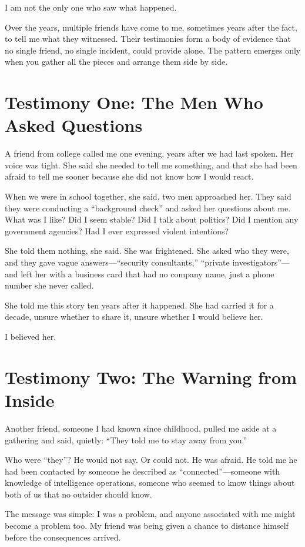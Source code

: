 \documentclass[11pt,openany]{book}
\begin{document}
I am not the only one who saw what happened.

Over the years, multiple friends have come to me, sometimes years after the fact, to tell me what they witnessed. Their testimonies form a body of evidence that no single friend, no single incident, could provide alone. The pattern emerges only when you gather all the pieces and arrange them side by side.

\section*{Testimony One: The Men Who Asked Questions}

A friend from college called me one evening, years after we had last spoken. Her voice was tight. She said she needed to tell me something, and that she had been afraid to tell me sooner because she did not know how I would react.

When we were in school together, she said, two men approached her. They said they were conducting a ``background check'' and asked her questions about me. What was I like? Did I seem stable? Did I talk about politics? Did I mention any government agencies? Had I ever expressed violent intentions?

She told them nothing, she said. She was frightened. She asked who they were, and they gave vague answers---``security consultants,'' ``private investigators''---and left her with a business card that had no company name, just a phone number she never called.

She told me this story ten years after it happened. She had carried it for a decade, unsure whether to share it, unsure whether I would believe her.

I believed her.

\section*{Testimony Two: The Warning from Inside}

Another friend, someone I had known since childhood, pulled me aside at a gathering and said, quietly: ``They told me to stay away from you.''

Who were ``they''? He would not say. Or could not. He was afraid. He told me he had been contacted by someone he described as ``connected''---someone with knowledge of intelligence operations, someone who seemed to know things about both of us that no outsider should know.

The message was simple: I was a problem, and anyone associated with me might become a problem too. My friend was being given a chance to distance himself before the consequences arrived.
\end{document}
